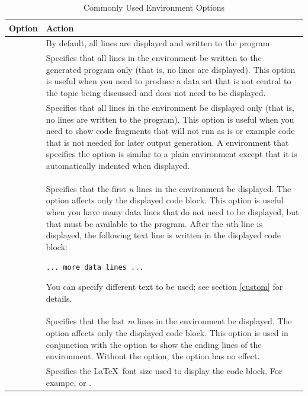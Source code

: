 \documentclass[article,oneside]{memoir}
\begin{document}
\begin{table}[H]
\caption{Commonly Used  Environment Options}\label{dsopt}
\begin{tabular}{lP{3.75in}}
\hline
\textbf{Option}  &  \textbf{Action} \\
\hline
                    & By default, all lines are displayed and written to the program.
\\[0.5\baselineskip]
      &
                 Specifies that all lines in the environment
                 be written to the generated program only
                (that is, no lines are displayed). This option is useful when you need
                to produce a data set that is not central to the topic being
                discussed and does not need to be displayed.
\\[0.5\baselineskip]
      &
                Specifies that all lines in the environment be displayed
                only (that is, no lines are written to the program). This option is
                useful when you need to show code fragments that will not run as is or
                example code that is not needed
                for later output generation. A  environment that specifies
                the  option is similar to a plain  environment except
                that it is automatically indented when displayed.
\\[0.5\baselineskip]
 &
               Specifies that the first \textit{n} lines
               in the environment be displayed. The option affects only the displayed
               code block.
               This option is useful when you have many data lines that do not need to be
               displayed, but that must be available to the program.
               After the \textit{n}th line is displayed, the following
               text line is written in the displayed code block:
               \par\texttt{... more data lines ...}\par%
               You can specify different text to be used;
               see section \ref{custom} for details.
\\[0.5\baselineskip]
 &
               Specifies that the last \textit{m} lines
               in the environment be displayed. The option affects only the displayed
               code block.
               This option is used in conjunction with the  option to show
               the ending lines of the  environment. Without the 
               option, the  option has no effect.
\\[0.5\baselineskip]
   & Specifies the \LaTeX\ font size used to display the
       code block. For exampe,  or .
\\
\hline

\end{tabular}
\end{table}
\end{document}
